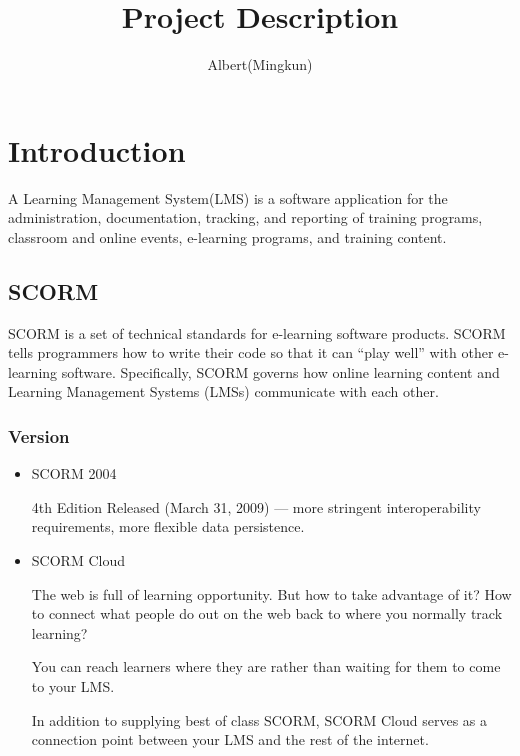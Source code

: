 \documentclass[11pt]{report}
\begin{document}
\title{Project Description}
\author{Albert(Mingkun)}
\maketitle

\section{Introduction}
A Learning Management System(LMS) is a software application for the administration, documentation, tracking, and reporting of training programs, 
classroom and online events, e-learning programs, and training content.
\subsection{SCORM}
SCORM is a set of technical standards for e-learning software products. SCORM tells programmers how to write their code so that it can ``play well'' 
with other e-learning software. Specifically, SCORM governs how online learning content and Learning Management Systems (LMSs) communicate with each 
other.

\subsubsection{Version}
\begin{itemize}
	\item
		SCORM 2004

		4th Edition Released (March 31, 2009) — more stringent interoperability requirements, more flexible data persistence.
	\item
		SCORM Cloud

		The web is full of learning opportunity. But how to take advantage of it? How to connect what people do out on the web back to where you 
		normally track learning?

		You can reach learners where they are rather than waiting for them to come to your LMS.

		In addition to supplying best of class SCORM, SCORM Cloud serves as a connection point between your LMS and the rest of the internet.
\end{itemize}
\end{document}
